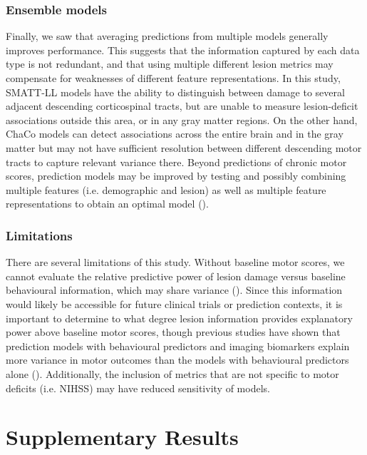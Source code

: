\documentclass[10pt]{article}
\begin{document}
\subsubsection*{Ensemble models}
Finally, we saw that averaging predictions from multiple models generally improves performance. This suggests that the information captured by each data type is not redundant, and that using multiple different lesion metrics may compensate for weaknesses of different feature representations. In this study, SMATT-LL models have the ability to distinguish between damage to several adjacent descending corticospinal tracts, but are unable to measure lesion-deficit associations outside this area, or in any gray matter regions. On the other hand, ChaCo models can detect associations across the entire brain and in the gray matter but may not have sufficient resolution between different descending motor tracts to capture relevant variance there. Beyond predictions of chronic motor scores, prediction models may be improved by testing and possibly combining multiple features (i.e. demographic and lesion) as well as multiple feature representations to obtain an optimal model (\cite{Kasties2021-rm, Park2022-nt}).

\subsubsection*{Limitations}
There are several limitations of this study. Without baseline motor scores, we cannot evaluate the relative predictive power of lesion damage versus baseline behavioural information, which may share variance (\cite{Feng2015-du, Bowren2022-rs}). Since this information would likely be accessible for future clinical trials or prediction contexts, it is important to determine to what degree lesion information provides explanatory power above baseline motor scores, though previous studies have shown that prediction models with behavioural predictors and imaging biomarkers explain more variance in motor outcomes than the models with behavioural predictors alone (\cite{Kim2017-xe, Feng2015-du}). Additionally, the inclusion of metrics that are not specific to motor deficits (i.e. NIHSS) may have reduced sensitivity of models. 

\clearpage



\printbibliography
\section*{Supplementary Results}
\end{document}

